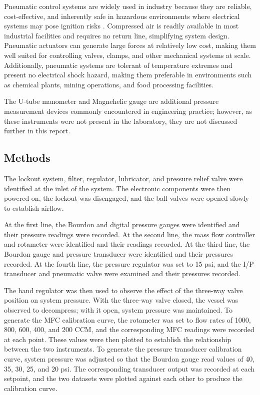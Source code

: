 Pneumatic control systems are widely used in industry because they are reliable, 
cost-effective, and inherently safe in hazardous environments where electrical systems 
may pose ignition risks \autocite{dindorf_review_2025}. Compressed air is readily 
available in most industrial facilities and requires no return line, simplifying system 
design. Pneumatic actuators can generate large forces at relatively low cost, making them 
well suited for controlling valves, clamps, and other mechanical systems at scale. 
Additionally, pneumatic systems are tolerant of temperature extremes and present no 
electrical shock hazard, making them preferable in environments such as chemical plants, 
mining operations, and food processing facilities.

The U-tube manometer and Magnehelic gauge are additional pressure measurement devices 
commonly encountered in engineering practice; however, as these instruments were not 
present in the laboratory, they are not discussed further in this report.

\subsection{Methods}

The lockout system, filter, regulator, lubricator, and pressure relief valve were 
identified at the inlet of the system. The electronic components were then powered on, 
the lockout was disengaged, and the ball valves were opened slowly to establish airflow.

At the first line, the Bourdon and digital pressure gauges were identified and their 
pressure readings were recorded. At the second line, the mass flow controller and 
rotameter were identified and their readings recorded. At the third line, the Bourdon 
gauge and pressure transducer were identified and their pressures recorded. At the fourth 
line, the pressure regulator was set to 15 psi, and the I/P transducer and pneumatic valve 
were examined and their pressures recorded.

The hand regulator was then used to observe the effect of the three-way valve position on 
system pressure. With the three-way valve closed, the vessel was observed to decompress; 
with it open, system pressure was maintained. To generate the MFC calibration curve, the 
rotameter was set to flow rates of 1000, 800, 600, 400, and 200 CCM, and the corresponding 
MFC readings were recorded at each point. These values were then plotted to establish the 
relationship between the two instruments. To generate the pressure transducer calibration 
curve, system pressure was adjusted so that the Bourdon gauge read values of 40, 35, 30, 
25, and 20 psi. The corresponding transducer output was recorded at each setpoint, and 
the two datasets were plotted against each other to produce the calibration curve.

